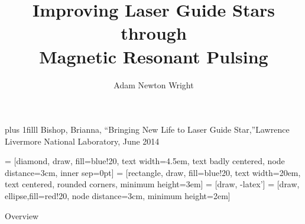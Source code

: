 \documentclass{beamer}
\title{Improving Laser Guide Stars through \\Magnetic Resonant Pulsing}
\author{Adam Newton Wright}
\institute{Willamette University}
\newcommand{\btVFill}{\vskip0pt plus 1filll}
\begin{document}
{
	\begin{frame}
	  \color{white}
	  \titlepage
	  \bigskip
	  \btVFill
	  {\tiny{Bishop, Brianna, ``Bringing New Life to Laser Guide Star,''Lawrence Livermore National Laboratory, June 2014}}

	\end{frame}
 } 




  
 = [diamond, draw, fill=blue!20, 
    text width=4.5em, text badly centered, node distance=3cm, inner sep=0pt]
 = [rectangle, draw, fill=blue!20, 
    text width=20em, text centered, rounded corners, minimum height=3em]
 = [draw, -latex']
 = [draw, ellipse,fill=red!20, node distance=3cm,
    minimum height=2em]


\begin{frame}{Overview}
\center
\vspace{-.5cm}
\end{frame}
\end{document}
